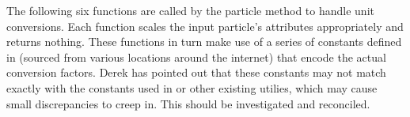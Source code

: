 \bigskip\bigskip

\noindent The following six functions are called by the  particle method to handle unit conversions. Each function scales the input particle's attributes appropriately and returns nothing. These functions in turn make use of a series of constants defined in  (sourced from various locations around the internet) that encode the actual conversion factors. Derek has pointed out that these constants may not match exactly with the constants used in \pkd{} or other existing utilies, which may cause small discrepancies to creep in. This should be investigated and reconciled.

\subsubsection{}

\subsubsection{}

\subsubsection{}

\subsubsection{}

\subsubsection{}

\subsubsection{}






